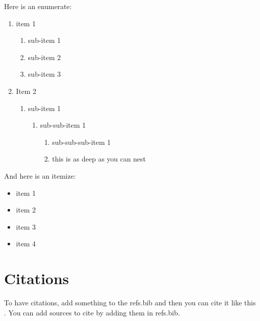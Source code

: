 \documentclass{article}
\begin{document}
Here is an enumerate:
\begin{enumerate}
    \item item 1
    \begin{enumerate}
        \item sub-item 1
        \item sub-item 2
        \item sub-item 3
    \end{enumerate}
    \item Item 2
    \begin{enumerate}
        \item sub-item 1
        \begin{enumerate}
            \item sub-sub-item 1
            \begin{enumerate}
                \item sub-sub-sub-item 1
                \item this is as deep as you can nest
            \end{enumerate}
        \end{enumerate}
    \end{enumerate}
\end{enumerate}

And here is an itemize:
\begin{itemize}
    \item item 1
    \item item 2
    \item item 3
    \item item 4
\end{itemize}


\clearpage
\section{Citations}
To have citations, add something to the refs.bib and then you can cite it like this \cite{example-citation}. You can add sources to cite by adding them in refs.bib.

\printbibliography
\end{document}

